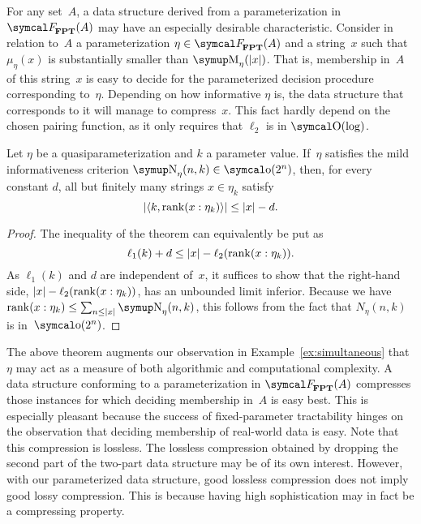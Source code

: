 For any set~$A$, a data structure derived from a parameterization in~$\calF_\cl{FPT}(A)$ may have an especially desirable characteristic.
Consider in relation to~$A$ a parameterization $\eta \in \calF_\cl{FPT}(A)$ and a string~$x$ such that $\mu_\eta(x)$ is substantially smaller than $\upM_\eta(\length{x})$.
That is, membership in~$A$ of this string~$x$ is easy to decide for the parameterized decision procedure corresponding to~$\eta$.
Depending on how informative $\eta$ is, the data structure that corresponds to it will manage to compress~$x$.
This fact hardly depend on the chosen pairing function, as it only requires that $\ell_2$ is in $\bigO(\log)$.
\begin{theorem}
\label{thm:easycompressible}%
  Let $\eta$ be a quasiparameterization and $k$ a parameter value.
  If~$\eta$ satisfies the mild informativeness criterion $\upN_\eta(n, k) \in \littleo(2^n)$, then, for every constant $d$, all but finitely many strings $x \in \eta_k$ satisfy
  \begin{equation*}
    {\lvert{\langle k, \operatorname{rank}(x : \eta_k)\rangle}\rvert} \le {\lvert x\rvert} - d.
  \end{equation*}
\end{theorem}
\begin{proof}
  The inequality of the theorem can equivalently be put as
  \begin{equation*}
    \ell_1(k) + d \le {\lvert x\rvert} - \ell_2(\operatorname{rank}(x : \eta_k)).
  \end{equation*}
  As $\ell_1(k)$ and $d$ are independent of~$x$, it suffices to show that the right-hand side, ${\lvert x\rvert} - \ell_2(\operatorname{rank}(x : \eta_k))$, has an unbounded limit inferior.
  Because we have $\rank(x : \eta_k) \le \sum_{n \le \length{x}} \upN_\eta(n, k)$, this follows from the fact that $N_\eta(n, k)$ is in~$\littleo(2^n)$.
\end{proof}

The above theorem augments our observation in Example~\ref{ex:simultaneous} that $\eta$ may act as a measure of both algorithmic and computational complexity.
A data structure conforming to a parameterization in $\calF_\cl{FPT}(A)$ compresses those instances for which deciding membership in~$A$ is easy best.
This is especially pleasant because the success of fixed-parameter tractability hinges on the observation that deciding membership of real-world data is easy.
Note that this compression is lossless.
The lossless compression obtained by dropping the second part of the two-part data structure may be of its own interest.
However, with our parameterized data structure, good lossless compression does not imply good lossy compression.
This is because having high sophistication may in fact be a compressing property.

